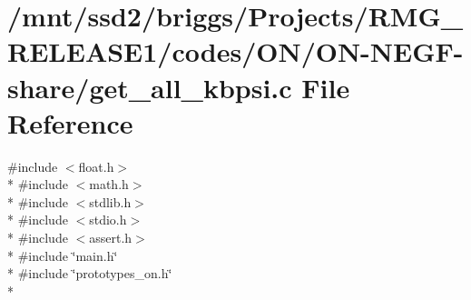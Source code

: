 \hypertarget{_o_n_2_o_n-_n_e_g_f-share_2get__all__kbpsi_8c}{\section{/mnt/ssd2/briggs/\-Projects/\-R\-M\-G\-\_\-\-R\-E\-L\-E\-A\-S\-E1/codes/\-O\-N/\-O\-N-\/\-N\-E\-G\-F-\/share/get\-\_\-all\-\_\-kbpsi.c File Reference}
\label{_o_n_2_o_n-_n_e_g_f-share_2get__all__kbpsi_8c}
}
{\ttfamily \#include $<$float.\-h$>$}\\*
{\ttfamily \#include $<$math.\-h$>$}\\*
{\ttfamily \#include $<$stdlib.\-h$>$}\\*
{\ttfamily \#include $<$stdio.\-h$>$}\\*
{\ttfamily \#include $<$assert.\-h$>$}\\*
{\ttfamily \#include \char`\"{}main.\-h\char`\"{}}\\*
{\ttfamily \#include \char`\"{}prototypes\-\_\-on.\-h\char`\"{}}\\*
